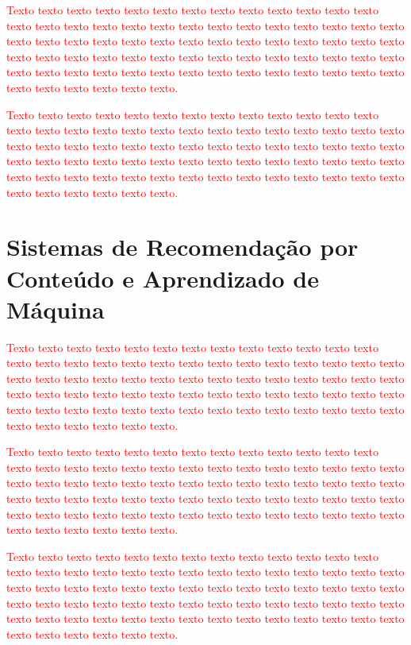 \documentclass[normaltoc, espacoumemeio, pnumromarab,ruledheader]{abnt}
\begin{document}
	\textcolor{red}{Texto texto texto texto texto texto texto texto texto texto texto texto texto texto texto texto texto texto texto texto texto texto texto texto texto texto texto texto texto texto texto texto texto texto texto texto texto texto texto texto texto texto texto texto texto texto texto texto texto texto texto texto texto texto texto texto texto texto texto texto texto texto texto texto texto texto texto texto texto texto texto texto texto texto texto.}
	
	\textcolor{red}{Texto texto texto texto texto texto texto texto texto texto texto texto texto texto texto texto texto texto texto texto texto texto texto texto texto texto texto texto texto texto texto texto texto texto texto texto texto texto texto texto texto texto texto texto texto texto texto texto texto texto texto texto texto texto texto texto texto texto texto texto texto texto texto texto texto texto texto texto texto texto texto texto texto texto texto.}

\chapter{Sistemas de Recomendação por Conteúdo e Aprendizado de Máquina}

\textcolor{red}{Texto texto texto texto texto texto texto texto texto texto texto texto texto texto texto texto texto texto texto texto texto texto texto texto texto texto texto texto texto texto texto texto texto texto texto texto texto texto texto texto texto texto texto texto texto texto texto texto texto texto texto texto texto texto texto texto texto texto texto texto texto texto texto texto texto texto texto texto texto texto texto texto texto texto texto.}

\textcolor{red}{Texto texto texto texto texto texto texto texto texto texto texto texto texto texto texto texto texto texto texto texto texto texto texto texto texto texto texto texto texto texto texto texto texto texto texto texto texto texto texto texto texto texto texto texto texto texto texto texto texto texto texto texto texto texto texto texto texto texto texto texto texto texto texto texto texto texto texto texto texto texto texto texto texto texto texto.}

\textcolor{red}{Texto texto texto texto texto texto texto texto texto texto texto texto texto texto texto texto texto texto texto texto texto texto texto texto texto texto texto texto texto texto texto texto texto texto texto texto texto texto texto texto texto texto texto texto texto texto texto texto texto texto texto texto texto texto texto texto texto texto texto texto texto texto texto texto texto texto texto texto texto texto texto texto texto texto texto.}
\end{document}
